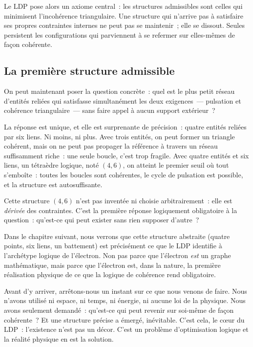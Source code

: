\documentclass[12pt, a4paper, openright]{book}
\begin{document}
\medskip

Le LDP pose alors un axiome central~: les structures admissibles sont celles qui minimisent l'incohérence triangulaire. Une structure qui n'arrive pas à satisfaire ses propres contraintes internes ne peut pas se maintenir~; elle se dissout. Seules persistent les configurations qui parviennent à se refermer sur elles-mêmes de façon cohérente.

\subsection*{La première structure admissible}

On peut maintenant poser la question concrète~: quel est le plus petit réseau d'entités reliées qui satisfasse simultanément les deux exigences~--- pulsation et cohérence triangulaire~--- sans faire appel à aucun support extérieur~?

\medskip

La réponse est unique, et elle est surprenante de précision~: quatre entités reliées par six liens. Ni moins, ni plus. Avec trois entités, on peut former un triangle cohérent, mais on ne peut pas propager la référence à travers un réseau suffisamment riche~: une seule boucle, c'est trop fragile. Avec quatre entités et six liens, un tétraèdre logique, noté $(4,6)$, on atteint le premier seuil où tout s'emboîte~: toutes les boucles sont cohérentes, le cycle de pulsation est possible, et la structure est autosuffisante.

\medskip

Cette structure $(4,6)$ n'est pas inventée ni choisie arbitrairement~: elle est \emph{dérivée} des contraintes. C'est la première réponse logiquement obligatoire à la question~: qu'est-ce qui peut exister sans rien supposer d'autre~?

\medskip

Dans le chapitre suivant, nous verrons que cette structure abstraite (quatre points, six liens, un battement) est précisément ce que le LDP identifie à l'archétype logique de l'électron. Non pas parce que l'électron \emph{est} un graphe mathématique, mais parce que l'électron est, dans la nature, la première réalisation physique de ce que la logique de cohérence rend obligatoire.

\medskip

Avant d'y arriver, arrêtons-nous un instant sur ce que nous venons de faire. Nous n'avons utilisé ni espace, ni temps, ni énergie, ni aucune loi de la physique. Nous avons seulement demandé~: qu'est-ce qui peut revenir sur soi-même de façon cohérente~? Et une structure précise a émergé, inévitable. C'est cela, le c\oe{}ur du LDP~: l'existence n'est pas un décor. C'est un problème d'optimisation logique et la réalité physique en est la solution.
\end{document}
